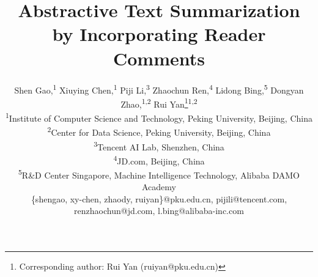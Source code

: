 \documentclass[letterpaper]{article} %
\begin{document}
    \title{Abstractive Text Summarization by Incorporating Reader Comments}
    \author{Shen Gao,\textsuperscript{1}
    	Xiuying Chen,\textsuperscript{1}
    	Piji Li,\textsuperscript{3}
    	Zhaochun Ren,\textsuperscript{4}
    	Lidong Bing,\textsuperscript{5}
    	Dongyan Zhao,\textsuperscript{1,2}
    	Rui Yan\thanks{Corresponding author: Rui Yan (ruiyan@pku.edu.cn)}\textsuperscript{1,2}\\
    	\textsuperscript{1}{Institute of Computer Science and Technology, Peking University, Beijing, China} \\
    	\textsuperscript{2}{Center for Data Science, Peking University, Beijing, China}\\
    	\textsuperscript{3}{Tencent AI Lab, Shenzhen, China} \\
    	\textsuperscript{4}{JD.com, Beijing, China} \\
    	\textsuperscript{5}{R\&D Center Singapore, Machine Intelligence Technology, Alibaba DAMO Academy}\\
    	\{shengao, xy-chen, zhaody, ruiyan\}@pku.edu.cn,
    	pijili@tencent.com, 
    	renzhaochun@jd.com,
    	l.bing@alibaba-inc.com}
            
\end{document}
